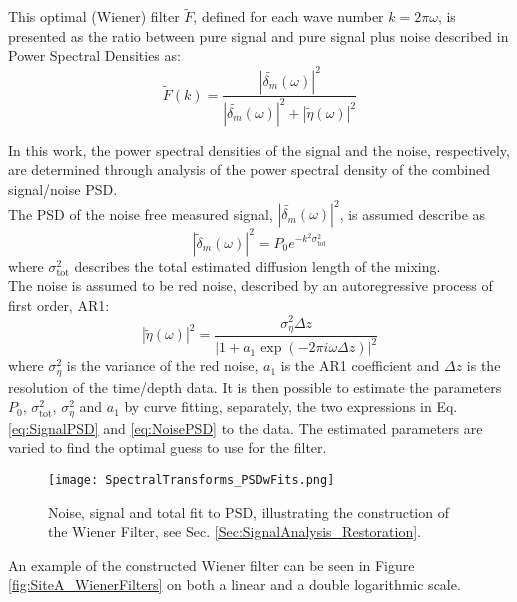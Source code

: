 \documentclass[../../CompleteThesis2/Complete_2ndDraft]{subfiles}
\begin{document}
This optimal (Wiener) filter $\tilde{F}$, defined for each wave number $k = 2\pi \omega$, is presented as the ratio between pure signal and pure signal plus noise described in Power Spectral Densities as:
\begin{equation}
	\tilde{F}(k) =\frac{|\tilde{\delta_m}(\omega)|^2}{|\tilde{\delta_m}(\omega)|^2 + |\tilde{\eta}(\omega)|^2}
	\label{eq:WienerFilter}
\end{equation}

In this work, the power spectral densities of the signal and the noise, respectively, are determined through analysis of the power spectral density of the combined signal/noise PSD.\\
The PSD of the noise free measured signal, $|\tilde{\delta_m}(\omega)|^2$, is assumed describe as 
\begin{equation}
	|\tilde{\delta}_m(\omega)|^2 = P_0 e^{-k^2 \sigma_{\text{tot}}^2}
	\label{eq:SignalPSD}
\end{equation}
where $\sigma_{\text{tot}}^2$ describes the total estimated diffusion length of the mixing.\\
The noise is assumed to be red noise, described by an autoregressive process of first order, AR1:
\begin{equation}
	|\tilde{\eta}(\omega)|^2 = \frac{\sigma_{\eta}^2 \Delta z}{|1 + a_1 \exp(-2\pi i \omega \Delta z)|^2}
	\label{eq:NoisePSD}
\end{equation}
where $\sigma_{\eta}^2$ is the variance of the red noise, $a_1$ is the AR1 coefficient and $\Delta z$ is the resolution of the time/depth data.
It is then possible to estimate the parameters $P_0$, $\sigma_{\text{tot}}^2$, $\sigma_{\eta}^2$ and $a_1$ by curve fitting, separately, the two expressions in Eq. \ref{eq:SignalPSD} and \ref{eq:NoisePSD} to the data. The estimated parameters are varied to find the optimal guess to use for the filter.

\begin{figure}
	\centering
	\texttt{[image: SpectralTransforms\_PSDwFits.png]}
	\caption[FFT, DCT, NDCT PSDs with Fit, Site A]{\small Noise, signal and total fit to PSD, illustrating the construction of the Wiener Filter, see Sec. \ref{Sec:SignalAnalysis_Restoration}.}
	\label{fig:SpectralTransforms_PSDwFits}
\end{figure}

An example of the constructed Wiener filter can be seen in Figure \ref{fig:SiteA_WienerFilters} on both a linear and a double logarithmic scale.
\end{document}
